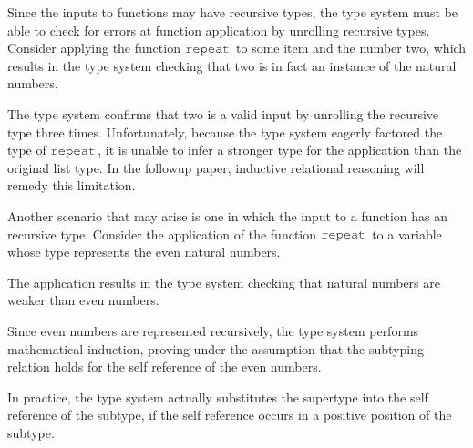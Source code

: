 \documentclass[acmsmall]{acmart}
\theoremstyle{definition}
\begin{document}
Since the inputs to functions may have recursive types, the type 
system must be able to check for errors at function application by unrolling
recursive types.
Consider applying the function $\J{repeat}$ to some item and the number two, 
which results in the type system checking that two is in fact an instance of the natural numbers.


\noindent
The type system confirms that two is a valid input by unrolling the recursive type three times.
Unfortunately, because the type system eagerly factored the type of $\J{repeat}$, it
is unable to infer a stronger type for the application than the original list type. 
In the followup paper, inductive relational reasoning will remedy this limitation.


Another scenario that may arise is one in which the input to a function has an recursive type.
Consider the application of the function $\J{repeat}$ to a variable whose type represents the even natural numbers.


\noindent
The application results in the type system checking that natural numbers are weaker than even numbers. 


\noindent
Since even numbers are represented recursively, the type system performs mathematical induction,
proving under the assumption that the subtyping relation holds for the self reference of the even numbers. 


\noindent
In practice, the type system actually substitutes the supertype into
the self reference of the subtype, if the self reference occurs in a positive position of the subtype.
\end{document}
